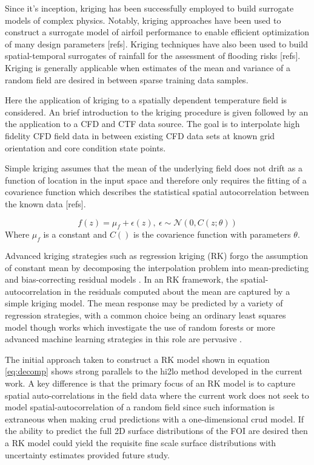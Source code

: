 Since it's inception, kriging has been successfully employed to build surrogate models of complex physics.  Notably, kriging approaches have been used to construct a surrogate model of airfoil performance to enable efficient optimization of many design parameters [refs].    Kriging techniques have also been used to build spatial-temporal surrogates of rainfall for the assessment of flooding risks [refs].  Kriging is generally applicable when estimates of the mean and variance of a random field are desired in between sparse training data samples.  

Here the application of kriging to a spatially dependent temperature field is considered.  An brief introduction to the kriging procedure is given followed by an the application to a CFD and CTF data source.  The goal is to interpolate high fidelity CFD field data in between existing CFD data sets at known grid orientation and core condition state points.

Simple kriging assumes that the mean of the underlying field does not drift as a function of location in the input space and therefore only requires the fitting of a covarience function which describes the statistical spatial autocorrelation between the known data [refs].  

\begin{equation}
f(z) = \mu_f + \epsilon(z),\ \epsilon \sim \mathcal N(0, C(z;\theta))
\end{equation}
Where $\mu_f$ is a constant and $C()$ is the covarience function with parameters $\theta$.

Advanced kriging strategies such as regression kriging (RK) forgo the assumption of constant mean by decomposing the interpolation problem into mean-predicting and bias-correcting residual models \cite{Hengl07}.  In an RK framework, the spatial-autocorrelation in the residuals computed about the mean are captured by a simple kriging model.  The mean response may be predicted by a variety of regression strategies, with a common choice being an ordinary least squares model though works which investigate the use of random forests or more advanced machine learning strategies in this role are pervasive \cite{LI20111647} \cite{LI2017112}.

The initial approach taken to construct a RK model shown in equation \ref{eq:decomp} shows strong parallels to the hi2lo method developed in the current work.  A key difference is that the primary focus of an RK model is to capture spatial auto-correlations in the field data where the current work does not seek to model spatial-autocorrelation of a random field since such information is extraneous when making crud predictions with a one-dimensional crud model.   If the ability to predict the full 2D surface distributions of the FOI are desired then a RK model could yield the requisite fine scale surface distributions with uncertainty estimates provided future study.


